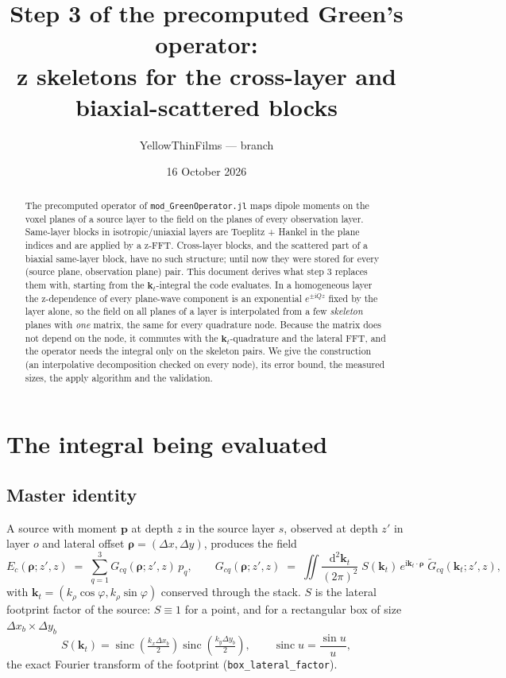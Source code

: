 \documentclass[11pt,a4paper]{article}
\title{Step 3 of the precomputed Green's operator:\\
z skeletons for the cross-layer and biaxial-scattered blocks}
\author{YellowThinFilms --- branch \code{z-skeletons}}
\date{16 October 2026}
\newcommand{\code}[1]{\texttt{#1}}
\newcommand{\kt}{\mathbf{k}_t}
\newcommand{\bfrho}{\boldsymbol{\rho}}
\newcommand{\dd}{\mathrm{d}}
\newcommand{\ii}{\mathrm{i}}
\newcommand{\sinc}{\operatorname{sinc}}
\theoremstyle{remark}
\begin{document}
\maketitle

\begin{abstract}
The precomputed operator of \code{mod\_GreenOperator.jl} maps dipole moments on the
voxel planes of a source layer to the field on the planes of every observation layer.
Same-layer blocks in isotropic/uniaxial layers are Toeplitz + Hankel in the plane
indices and are applied by a z-FFT. Cross-layer blocks, and the scattered part of a
biaxial same-layer block, have no such structure; until now they were stored for every
(source plane, observation plane) pair. This document derives what step 3 replaces them
with, starting from the $\kt$-integral the code evaluates. In a homogeneous layer the
z-dependence of every plane-wave component is an exponential $e^{\pm\ii Q z}$ fixed by
the layer alone, so the field on all planes of a layer is interpolated from a few
\emph{skeleton} planes with \emph{one} matrix, the same for every quadrature node.
Because the matrix does not depend on the node, it commutes with the $\kt$-quadrature and
the lateral FFT, and the operator needs the integral only on the skeleton pairs. We give
the construction (an interpolative decomposition checked on every node), its error
bound, the measured sizes, the apply algorithm and the validation.
\end{abstract}

\tableofcontents

\section{The integral being evaluated}
\label{sec:integral}

\subsection{Master identity}

A source with moment $\mathbf{p}$ at depth $z$ in the source layer $s$, observed at depth
$z'$ in layer $o$ and lateral offset $\bfrho=(\Delta x,\Delta y)$, produces the field
\begin{equation}
  E_c(\bfrho; z', z) \;=\; \sum_{q=1}^{3} G_{cq}(\bfrho; z', z)\, p_q,
  \qquad
  G_{cq}(\bfrho; z', z) \;=\; \iint \frac{\dd^2 \kt}{(2\pi)^2}\;
     S(\kt)\, e^{\ii \kt\cdot\bfrho}\; \widetilde{G}_{cq}(\kt; z', z),
  \label{eq:master}
\end{equation}
with $\kt=(k_\rho\cos\varphi, k_\rho\sin\varphi)$ conserved through the stack. $S$ is the
lateral footprint factor of the source: $S\equiv 1$ for a point, and for a rectangular
box of size $\Delta x_b\times\Delta y_b$
\begin{equation}
  S(\kt) = \sinc\!\left(\tfrac{k_x\Delta x_b}{2}\right)\sinc\!\left(\tfrac{k_y\Delta y_b}{2}\right),
  \qquad \sinc u = \frac{\sin u}{u},
\end{equation}
the exact Fourier transform of the footprint (\code{box\_lateral\_factor}).
\end{document}
